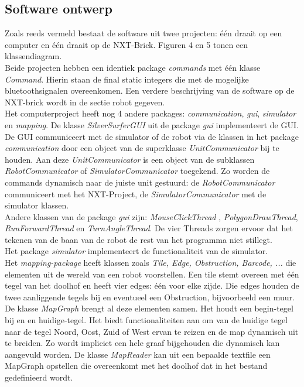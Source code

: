 \documentclass[tt3]{penoverslag}
\begin{document}
\subsection{Software ontwerp} %
\label{ssec:Sdesign}
Zoals reeds vermeld bestaat de software uit twee projecten: \'e\'en draait op een computer en \'e\'en draait op de NXT-Brick. Figuren 4 en 5 tonen een klassendiagram.\\
Beide projecten hebben een identiek package \textit{commands} met \'e\'en klasse \textit{Command}. Hierin staan de final static integers die met de mogelijke bluetoothsignalen overeenkomen. Een verdere beschrijving van de software op de NXT-brick wordt in de sectie robot gegeven.\\
Het computerproject heeft nog 4 andere packages: \textit{communication}, \textit{gui}, \textit{simulator} en \textit{mapping}. 
De klasse \textit{SilverSurferGUI} uit de package \textit{gui} implementeert de GUI. De GUI communiceert met de simulator of de robot via de klassen in het package \textit{communication} door een object van de superklasse \textit{UnitCommunicator} bij te houden. Aan deze \textit{UnitCommunicator} is een object van de subklassen \textit{RobotCommunicator} of \textit{SimulatorCommunicator}  toegekend. Zo worden de commands dynamisch naar de juiste unit gestuurd: de \textit{RobotCommunicator} communiceert met het NXT-Project, de \textit{SimulatorCommunicator} met de simulator klassen.\\
Andere klassen van de package \textit{gui} zijn: \textit{MouseClickThread} , \textit{PolygonDrawThread}, \textit{RunForwardThread} en \textit{TurnAngleThread}. De vier Threads zorgen ervoor dat het tekenen van de baan van de robot de rest van het programma niet stillegt. \\
Het package \textit{simulator} implementeert de functionaliteit van de simulator. \\
Het \textit{mapping-package} heeft klassen zoals \textit{Tile, Edge, Obstruction, Barcode, ...} die elementen uit de wereld van een robot voorstellen. Een tile stemt overeen met \'e\'en tegel van het doolhof en heeft vier edges: \'e\'en voor elke zijde. Die edges houden de twee aanliggende tegels bij en eventueel een Obstruction, bijvoorbeeld een muur. De klasse \textit{MapGraph} brengt al deze elementen samen. Het houdt een begin-tegel bij en en huidige-tegel. Het biedt functionaliteiten aan om van de huidige tegel naar de tegel Noord, Oost, Zuid of West ervan te reizen en de map dynamisch uit te breiden. Zo wordt impliciet een hele graaf bijgehouden die dynamisch kan aangevuld worden. De klasse \textit{MapReader} kan uit een bepaalde textfile een MapGraph opstellen die overeenkomt met het doolhof dat in het bestand gedefinieerd wordt.
\end{document}
